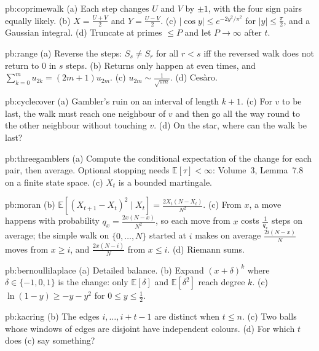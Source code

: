 \begin{hint}{pb:coprimewalk}
(a) Each step changes $U$ and $V$ by $\pm1$, with the four sign pairs equally likely. (b) $X=\frac{U+V}2$ and $Y=\frac{U-V}2$. (c) $|\cos y|\le e^{-2y^2/\pi^2}$ for $|y|\le\frac\pi2$, and
a Gaussian integral. (d) Truncate at primes $\le P$ and let $P\to\infty$ after $t$.
\end{hint}

\begin{hint}{pb:range}
(a) Reverse the steps: $S_s\ne S_r$ for all $r<s$ iff the reversed walk does not return to $0$ in $s$ steps. (b) Returns only happen at even times, and
$\sum_{k=0}^mu_{2k}=(2m+1)u_{2m}$. (c) $u_{2m}\sim\frac1{\sqrt{\pi m}}$. (d) Cesàro.
\end{hint}

\begin{hint}{pb:cyclecover}
(a) Gambler's ruin on an interval of length $k+1$. (c) For $v$ to be last, the walk must reach one neighbour of $v$ and then go all the way round
to the other neighbour without touching $v$. (d) On the star, where can the walk be last?
\end{hint}

\begin{hint}{pb:threegamblers}
(a) Compute the conditional expectation of the change for each pair, then average. Optional stopping needs $\mathbb E[\tau]<\infty$: Volume~3, Lemma~7.8 on a finite
state space. (c) $X_t$ is a bounded martingale.
\end{hint}

\begin{hint}{pb:moran}
(b) $\mathbb E[(X_{t+1}-X_t)^2\mid X_t]=\frac{2X_t(N-X_t)}{N^2}$. (c) From $x$, a move happens with probability $q_x=\frac{2x(N-x)}{N^2}$, so each move from $x$ costs $\frac1{q_x}$ steps on
average; the simple walk on $\{0,\dots,N\}$ started at $i$ makes on average $\frac{2i(N-x)}N$ moves from $x\ge i$, and $\frac{2x(N-i)}N$ from $x\le i$. (d) Riemann sums.
\end{hint}

\begin{hint}{pb:bernoullilaplace}
(a) Detailed balance. (b) Expand $(x+\delta)^k$ where $\delta\in\{-1,0,1\}$ is the change: only $\mathbb E[\delta]$ and $\mathbb E[\delta^2]$ reach degree $k$. (c) $\ln(1-y)\ge-y-y^2$ for $0\le y\le\frac12$.
\end{hint}

\begin{hint}{pb:kacring}
(b) The edges $i,\dots,i+t-1$ are distinct when $t\le n$. (c) Two balls whose windows of edges are disjoint have independent colours. (d) For which
$t$ does (c) say something?
\end{hint}


